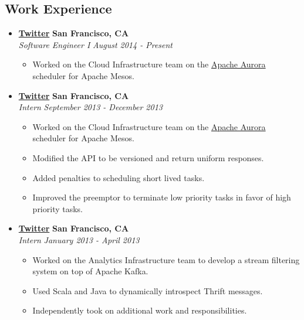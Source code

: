 \documentclass[10pt,letterpaper]{article}
\begin{document}
\subsection*{Work Experience}
  \begin{itemize}
    \parskip=-0.1em

    \item[]
    {\href{http://www.twitter.com}{\textbf{Twitter}} \hfill
      \textbf{San Francisco, CA}}
    \\
    {\emph{Software Engineer I} \hfill \emph{August 2014 - Present}}

    \begin{itemize}[label=\textbullet]
      \itemsep0em
      \item Worked on the Cloud Infrastructure team on the
        \href{aurora.incubator.apache.org}{Apache Aurora} scheduler for Apache Mesos.
    \end{itemize}

    \item[]
    {\href{http://www.twitter.com}{\textbf{Twitter}} \hfill
      \textbf{San Francisco, CA}}
    \\
    {\emph{Intern} \hfill \emph{September 2013 - December 2013}}

    \begin{itemize}[label=\textbullet]
      \itemsep0em
      \item Worked on the Cloud Infrastructure team on the
        \href{aurora.incubator.apache.org}{Apache Aurora} scheduler for Apache Mesos.
      \item Modified the API to be versioned and return uniform responses.
      \item Added penalties to scheduling short lived tasks.
      \item Improved the preemptor to terminate low priority tasks in favor of
        high priority tasks.
    \end{itemize}

    \item[]
    {\href{http://www.twitter.com}{\textbf{Twitter}} \hfill
      \textbf{San Francisco, CA}}
    \\
    {\emph{Intern} \hfill \emph{January 2013 - April 2013}}

    \begin{itemize}[label=\textbullet]
      \itemsep0em
      \item Worked on the Analytics Infrastructure team to develop a stream
        filtering system on top of Apache Kafka.
      \item Used Scala and Java to dynamically introspect Thrift messages.
      \item Independently took on additional work and responsibilities.
    \end{itemize}


\end{itemize}
\end{document}
